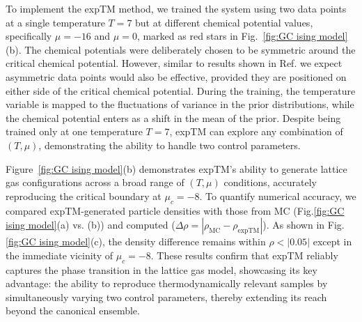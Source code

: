 \documentclass[aip,jcp,reprint,longbibliography]{revtex4-1}
\newcommand{\slee}[1]{{\color{blue}{#1}}}
\begin{document}
To implement the expTM method, we trained the system using two data points at a single temperature $T = 7$ but at different chemical potential values, specifically $\mu = -16$ and $\mu = 0$, marked as red stars in Fig.~\ref{fig:GC ising model}(b). The chemical potentials were deliberately chosen to be symmetric around the critical chemical potential. However, similar to results shown in Ref.  we expect asymmetric data points would also be effective, provided they are positioned on either side of the critical chemical potential. During the training, the temperature variable is mapped to the fluctuations of variance in the prior distributions, while the chemical potential enters as a shift in the mean of the prior.  
Despite being trained only at one temperature $T=7$, expTM can explore any combination of $(T, \mu)$, demonstrating the ability to handle two control parameters.


Figure~\ref{fig:GC ising model}(b) demonstrates expTM’s ability to generate lattice gas configurations across a broad range of $(T, \mu)$ conditions, accurately reproducing the critical boundary at $\mu_c=-8$. To quantify numerical accuracy, we compared expTM-generated particle densities with those from MC (Fig.\ref{fig:GC ising model}(a) vs. (b)) and computed ($\Delta \rho = |\rho_\text{MC}-\rho_\text{expTM}|$). As shown in Fig. \ref{fig:GC ising model}(c), the density difference remains within $\rho < |0.05|$ except in the immediate vicinity of $\mu_c=-8$. These results confirm that expTM reliably captures the phase transition in the lattice gas model, showcasing its key advantage: the ability to reproduce thermodynamically relevant samples by simultaneously varying two control parameters, thereby extending its reach beyond the canonical ensemble.


\slee{To further evaluate the role of the exponentially tilted prior, we performed an ablation study in which the exponential tilting term was removed from the prior, and it was replaced with a unit Gaussian independent of the thermodynamic parameters. 
In this setup, the model reduces to a standard diffusion model without thermodynamic conditioning embedded in the prior. During sampling, one can still attempt to extrapolate to thermodynamic conditions of interest; however, the model fails to recover the sharp phase boundaries observed in the MCMC results. This result confirms that embedding thermodynamic variables directly into the prior through exponential tilting is essential for preserving thermodynamic consistency and accurately reproducing phase behavior. The following results are demonstrated in the Supporting Information (SI) Sec.IV, along with Fig.S3-S5. } 
\end{document}
